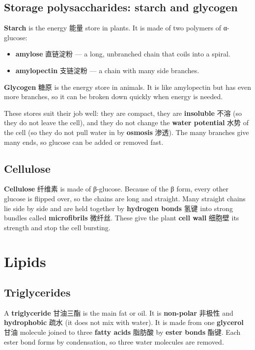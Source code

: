 \documentclass[11pt]{article}
\begin{document}
\subsection*{Storage polysaccharides: starch and glycogen}

\textbf{Starch} is the energy 能量 store in plants. It is made of two polymers of α-glucose:

\begin{itemize}
\item \textbf{amylose} 直链淀粉 — a long, unbranched chain that coils into a spiral.

\item \textbf{amylopectin} 支链淀粉 — a chain with many side branches.

\end{itemize}

\textbf{Glycogen} 糖原 is the energy store in animals. It is like amylopectin but has even more branches, so it can be broken down quickly when energy is needed.

These stores suit their job well: they are compact, they are \textbf{insoluble} 不溶 (so they do not leave the cell), and they do not change the \textbf{water potential} 水势 of the cell (so they do not pull water in by \textbf{osmosis} 渗透). The many branches give many ends, so glucose can be added or removed fast.

\subsection*{Cellulose}

\textbf{Cellulose} 纤维素 is made of β-glucose. Because of the β form, every other glucose is flipped over, so the chains are long and straight. Many straight chains lie side by side and are held together by \textbf{hydrogen bonds} 氢键 into strong bundles called \textbf{microfibrils} 微纤丝. These give the plant \textbf{cell wall} 细胞壁 its strength and stop the cell bursting.

\section*{Lipids}

\subsection*{Triglycerides}

A \textbf{triglyceride} 甘油三酯 is the main fat or oil. It is \textbf{non-polar} 非极性 and \textbf{hydrophobic} 疏水 (it does not mix with water). It is made from one \textbf{glycerol} 甘油 molecule joined to three \textbf{fatty acids} 脂肪酸 by \textbf{ester bonds} 酯键. Each ester bond forms by condensation, so three water molecules are removed.
\end{document}
